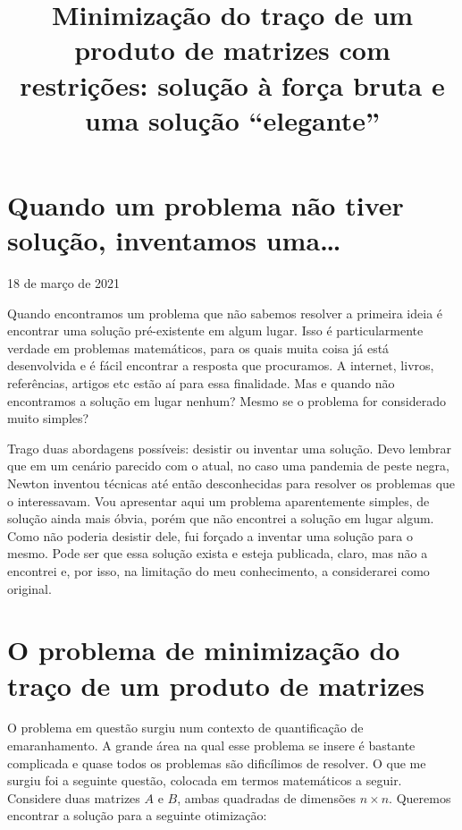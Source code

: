 \documentclass[11pt]{article}
\title{Minimização do traço de um produto de matrizes com restrições: solução à força bruta e uma solução ``elegante''}
\begin{document}
    
    \maketitle
    
    

    
    \hypertarget{quando-um-problema-nuxe3o-tiver-soluuxe7uxe3o-inventamos-uma}{%
\section{Quando um problema não tiver solução, inventamos
uma\ldots{}}\label{quando-um-problema-nuxe3o-tiver-soluuxe7uxe3o-inventamos-uma}}

    18 de março de 2021

Quando encontramos um problema que não sabemos resolver a primeira ideia
é encontrar uma solução pré-existente em algum lugar. Isso é
particularmente verdade em problemas matemáticos, para os quais muita
coisa já está desenvolvida e é fácil encontrar a resposta que
procuramos. A internet, livros, referências, artigos etc estão aí para
essa finalidade. Mas e quando não encontramos a solução em lugar nenhum?
Mesmo se o problema for considerado muito simples?

Trago duas abordagens possíveis: desistir ou inventar uma solução. Devo
lembrar que em um cenário parecido com o atual, no caso uma pandemia de
peste negra, Newton inventou técnicas até então desconhecidas para
resolver os problemas que o interessavam. Vou apresentar aqui um
problema aparentemente simples, de solução ainda mais óbvia, porém que
não encontrei a solução em lugar algum. Como não poderia desistir dele,
fui forçado a inventar uma solução para o mesmo. Pode ser que essa
solução exista e esteja publicada, claro, mas não a encontrei e, por
isso, na limitação do meu conhecimento, a considerarei como original.

    \hypertarget{o-problema-de-minimizauxe7uxe3o-do-trauxe7o-de-um-produto-de-matrizes}{%
\section{O problema de minimização do traço de um produto de
matrizes}\label{o-problema-de-minimizauxe7uxe3o-do-trauxe7o-de-um-produto-de-matrizes}}

    O problema em questão surgiu num contexto de quantificação de
emaranhamento. A grande área na qual esse problema se insere é bastante
complicada e quase todos os problemas são dificílimos de resolver. O que
me surgiu foi a seguinte questão, colocada em termos matemáticos a
seguir. Considere duas matrizes \(A\) e \(B\), ambas quadradas de
dimensões \(n\times n\). Queremos encontrar a solução para a seguinte
otimização:
\end{document}
